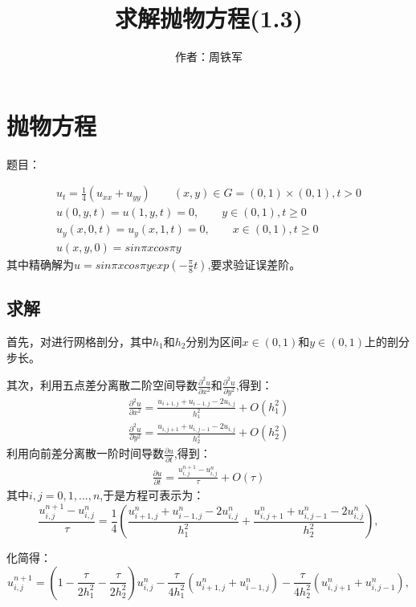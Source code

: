 \documentclass[12pt,a4paper]{article}
\title{求解抛物方程(1.3)}
\author{作者：周铁军}
\date{\chntoday}
\begin{document}
\maketitle
\newpage
\section{抛物方程}
 题目：
 
 \begin{equation}
  \begin{array}{l}{ u_t = \frac{1}{4}(u_{xx}+u_{yy}) \qquad (x,y) \in G=(0,1)\times(0,1),t > 0}\\
  {u(0,y,t) = u(1,y,t)=0,\qquad y \in (0,1),t \geq 0 }\\
  {u_y(x,0,t) = u_y(x,1,t)=0,\qquad x \in (0,1),t \geq 0}\\
  {u(x,y,0)=sin{\pi x}cos{\pi y}}\end{array}
 \end{equation}
其中精确解为$u = sin{\pi x}cos{ \pi y}exp{(-\frac{\pi}{8}t)} $,要求验证误差阶。

\subsection{求解}
首先，对进行网格剖分，其中$h_1$和$h_2$分别为区间$x \in (0,1)$和$y \in (0,1)$上的剖分步长。

其次，利用五点差分离散二阶空间导数$\frac{\partial^2 u}{\partial x^2}$和$\frac{\partial^2 u}{\partial y^2}$,得到：
\begin{equation}
\begin{array}{l}{\frac{\partial^2 u}{\partial x^2} = \frac{u_{i+1,j}+u_{i-1,j}-2u_{i,j}}{h_1^2} + O(h_1^2)}\\
{\frac{\partial^2 u}{\partial y^2} = \frac{u_{i,j+1}+u_{i,j-1}-2u_{i,j}}{h_2^2}+ O(h_2^2)}\end{array}
\end{equation}
利用向前差分离散一阶时间导数$\frac{\partial u}{\partial t}$,得到：
\begin{equation}
\begin{array}{l}{\frac{\partial u}{\partial t} = \frac{u^{n+1}_{i,j}-u^n_{i,j}}{\tau} + O(\tau)}\end{array}
\end{equation}
其中$i,j=0,1,...,n$,于是方程可表示为：
$$\frac{u^{n+1}_{i,j}-u^n_{i,j}}{\tau}=\frac{1}{4}(\frac{u^n_{i+1,j}+u^n_{i-1,j}-2u^n_{i,j}}{h_1^2}+\frac{u^n_{i,j+1}+u^n_{i,j-1}-2u^n_{i,j}}{h_2^2}),$$

化简得：
$$u^{n+1}_{i,j} = (1-\frac{ \tau}{2h_1^2}-\frac{ \tau}{2h_2^2})u^n_{i,j}-\frac{\tau}{4h_1^2}(u^n_{i+1,j}+u^n_{i-1,j})-\frac{\tau}{4h_2^2}(u^n_{i,j+1}+u^n_{i,j-1}),$$
\end{document}
